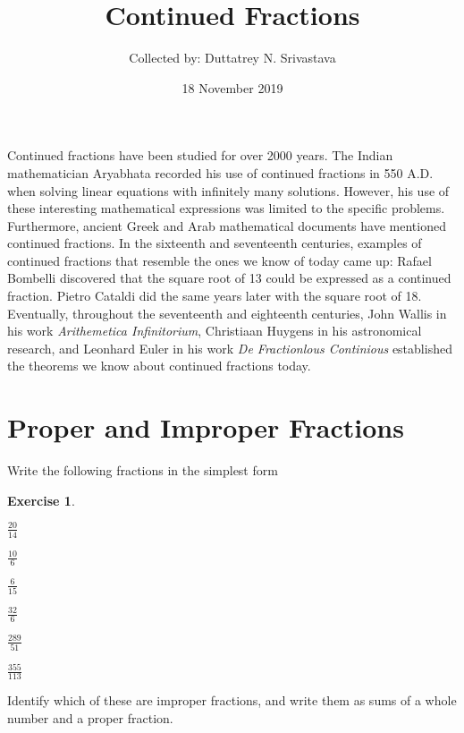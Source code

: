 \documentclass[12pt]{amsart}
\theoremstyle{definition}
\newtheorem{xca}[theorem]{Exercise}
\theoremstyle{remark}
\numberwithin{equation}{section}
\begin{document}
\title{ Continued Fractions}
\author{Collected by: Duttatrey N. Srivastava}


\date{18 November 2019}


\maketitle
Continued fractions have been studied for over 2000 years. The Indian mathematician Aryabhata recorded his use of continued fractions in 550 A.D. when solving linear equations with infinitely many solutions. However, his use of these interesting mathematical expressions was limited to the specific problems. Furthermore, ancient Greek and Arab mathematical documents have mentioned continued fractions.  In the sixteenth and seventeenth centuries, examples of continued fractions that resemble the ones we know of today came up: Rafael Bombelli discovered that the square root of 13 could be expressed as a continued fraction. Pietro Cataldi did the same years later with the square root of 18. Eventually, throughout the seventeenth and eighteenth centuries, John Wallis in his work \textit{Arithemetica Infinitorium}, Christiaan Huygens in his astronomical research, and Leonhard Euler in his work \textit{De Fractionlous Continious} established the theorems we know about continued fractions today. 



\section{Proper and Improper Fractions}
Write the following fractions in the simplest form
\begin{xca}

\begin{enumerate*}
\item $\frac{20}{14}$
\item $\frac{10}{6}$
\item $\frac{6}{15}$
\item $\frac{32}{6}$
\item $\frac{289}{51}$
\item $\frac{355}{113}$
\end{enumerate*}
\end{xca}
 Identify which of these are improper fractions, and write them as sums of a whole number and a proper fraction.
\end{document}
